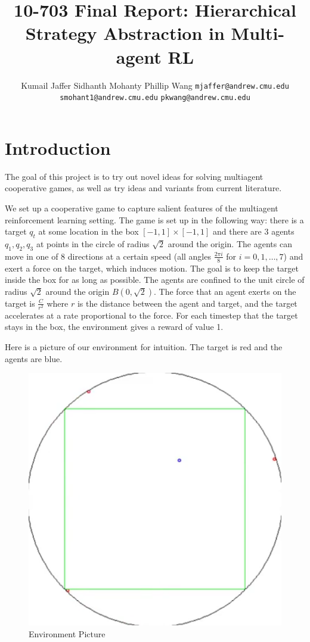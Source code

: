 \documentclass{article}
\title{10-703 Final Report: Hierarchical Strategy Abstraction in Multi-agent RL}
\author{Kumail Jaffer \And Sidhanth Mohanty \And Phillip
Wang
\AND
\texttt{mjaffer@andrew.cmu.edu} \And
\texttt{smohant1@andrew.cmu.edu}\And
\texttt{pkwang@andrew.cmu.edu}}
\begin{document}
\maketitle

\section{Introduction}
The goal of this project is to try out novel ideas for
solving multiagent cooperative games, as well as try
ideas and variants from current literature.

We set up a cooperative game to capture salient features
of the multiagent reinforcement learning setting.
The game is set up in the following way: there is a target
$q_t$ at some location in the box $[-1,1]\times[-1,1]$
and there are 3 agents $q_1,q_2,q_3$ at points in the circle of
radius $\sqrt{2}$ around the origin. The agents can move
in one of 8 directions at a certain speed (all angles
$\frac{2\pi i}{8}$ for $i=0,1,\ldots,7$) and exert a force
on the target, which induces motion. The goal is to
keep the target inside the box for as long as possible.
The agents are confined to the unit circle of radius
$\sqrt{2}$ around the origin $B(0,\sqrt{2})$.
The force that an agent exerts on the target is $\frac{C}{r^2}$
where $r$ is the distance between the agent and target, and
the target accelerates at a rate proportional to the force.
For each timestep that the target stays in the box, the
environment gives a reward of value 1.

Here is a picture of our environment for intuition. The target is red
and the agents are blue.

\begin{figure}[H]
\centering
\includegraphics[scale=0.17]{pic_of_env.png}
\caption{Environment Picture}
\end{figure}
\end{document}
